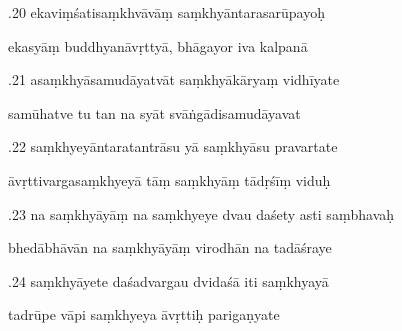 \documentclass[article,12pt,a4paper]{memoir}%
\newcounter{parCount}
\begin{document}
	  
	  \pstart {}.20 ekaviṃśatisaṃkhvāvāṃ saṃkhyāntarasarūpayoḥ 
	{}
	\pend%
      

	  
	  \pstart \leavevmode%
	ekasyāṃ buddhyanāvṛttyā, bhāgayor iva kalpanā 
	{}
	\pend%
      

	  
	  \pstart {}.21 asaṃkhyāsamudāyatvāt saṃkhyākāryaṃ vidhīyate 
	{}
	\pend%
      

	  
	  \pstart \leavevmode%
	samūhatve tu tan na syāt svāṅgādisamudāyavat 
	{}
	\pend%
      

	  
	  \pstart {}.22 saṃkhyeyāntaratantrāsu yā saṃkhyāsu pravartate 
	{}
	\pend%
      

	  
	  \pstart \leavevmode%
	āvṛttivargasaṃkhyeyā tāṃ saṃkhyāṃ tādṛśīṃ viduḥ 
	{}
	\pend%
      

	  
	  \pstart {}.23 na saṃkhyāyāṃ na saṃkhyeye dvau daśety asti saṃbhavaḥ 
	{}
	\pend%
      

	  
	  \pstart \leavevmode%
	bhedābhāvān na saṃkhyāyāṃ virodhān na tadāśraye 
	{}
	\pend%
      

	  
	  \pstart {}.24 saṃkhyāyete daśadvargau dvidaśā iti saṃkhyayā 
	{}
	\pend%
      

	  
	  \pstart \leavevmode%
	tadrūpe vāpi saṃkhyeya āvṛttiḥ parigaṇyate 
	{}
	\pend%
      
\end{document}
